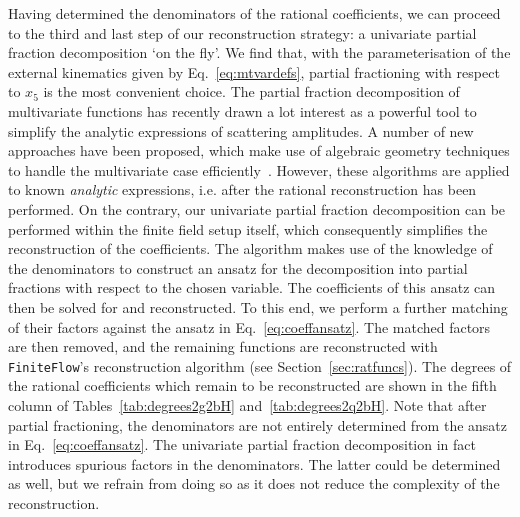 \documentclass[main.tex]{subfiles}
\begin{document}
Having determined the denominators of the rational coefficients, we can proceed to the third and last step of our reconstruction strategy:  a univariate partial fraction decomposition `on the fly'. We find that, with the parameterisation of the external kinematics given by Eq.~\ref{eq:mtvardefs}, partial fractioning with respect to $x_5$ is the most convenient choice. 
The partial fraction decomposition of multivariate functions has recently drawn a lot interest as a powerful tool to simplify the analytic expressions of scattering amplitudes. A number of new approaches have been proposed, which make use of algebraic geometry techniques to handle the multivariate case efficiently~\cite{Leinartas:1978,Raichev:2012,Abreu:2019odu,Boehm:2020ijp,Heller:2021qkz}. However, these algorithms are applied to known \textit{analytic} expressions, i.e. after the rational reconstruction has been performed. On the contrary, our univariate partial fraction decomposition can be performed within the finite field setup itself, which consequently simplifies the reconstruction of the coefficients.
The algorithm makes use of the knowledge of the denominators to construct an ansatz for the decomposition into partial fractions with respect to the chosen variable. The coefficients of this ansatz can then be solved for and reconstructed. To this end, we perform a further matching of their factors against the ansatz in Eq.~\ref{eq:coeffansatz}. The matched factors are then removed, and the remaining functions are reconstructed with \texttt{FiniteFlow}'s reconstruction algorithm (see Section~\ref{sec:ratfuncs}). The degrees of the rational coefficients which remain to be reconstructed are shown in the fifth column of Tables~\ref{tab:degrees2g2bH} and~\ref{tab:degrees2q2bH}. Note that after partial fractioning, the denominators are not entirely determined from the ansatz in Eq.~\ref{eq:coeffansatz}. The univariate partial fraction decomposition in fact introduces spurious factors in the denominators. The latter could be determined as well, but we refrain from doing so as it does not reduce the complexity of the reconstruction.
\end{document}
